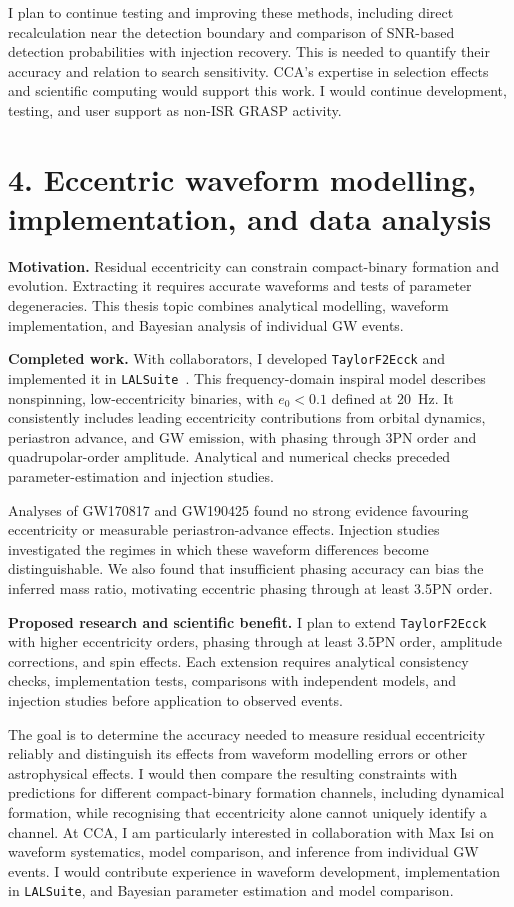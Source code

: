 \documentclass[11pt]{article}
\begin{document}
I plan to continue testing and improving these methods, including direct recalculation near the detection boundary and comparison of SNR-based detection probabilities with injection recovery. This is needed to quantify their accuracy and relation to search sensitivity. CCA's expertise in selection effects and scientific computing would support this work. I would continue development, testing, and user support as non-ISR GRASP activity.

\section*{4. Eccentric waveform modelling, implementation, and data analysis}

\textbf{Motivation.} Residual eccentricity can constrain compact-binary formation and evolution. Extracting it requires accurate waveforms and tests of parameter degeneracies. This thesis topic combines analytical modelling, waveform implementation, and Bayesian analysis of individual GW events.

\textbf{Completed work.} With collaborators, I developed \texttt{TaylorF2Ecck} and implemented it in \texttt{LALSuite}~\cite{ecc}. This frequency-domain inspiral model describes nonspinning, low-eccentricity binaries, with $e_0<0.1$ defined at 20~Hz. It consistently includes leading eccentricity contributions from orbital dynamics, periastron advance, and GW emission, with phasing through 3PN order and quadrupolar-order amplitude. Analytical and numerical checks preceded parameter-estimation and injection studies.

Analyses of GW170817 and GW190425 found no strong evidence favouring eccentricity or measurable periastron-advance effects. Injection studies investigated the regimes in which these waveform differences become distinguishable. We also found that insufficient phasing accuracy can bias the inferred mass ratio, motivating eccentric phasing through at least 3.5PN order. 

\textbf{Proposed research and scientific benefit.} I plan to extend \texttt{TaylorF2Ecck} with higher eccentricity orders, phasing through at least 3.5PN order, amplitude corrections, and spin effects. Each extension requires analytical consistency checks, implementation tests, comparisons with independent models, and injection studies before application to observed events.

The goal is to determine the accuracy needed to measure residual eccentricity reliably and distinguish its effects from waveform modelling errors or other astrophysical effects. I would then compare the resulting constraints with predictions for different compact-binary formation channels, including dynamical formation, while recognising that eccentricity alone cannot uniquely identify a channel. At CCA, I am particularly interested in collaboration with Max Isi on waveform systematics, model comparison, and inference from individual GW events. I would contribute experience in waveform development, implementation in \texttt{LALSuite}, and Bayesian parameter estimation and model comparison.
\end{document}
